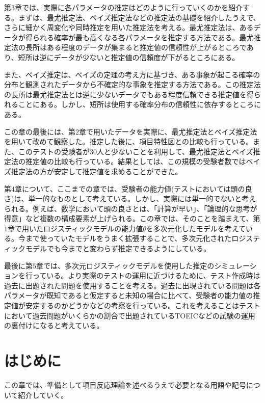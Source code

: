 \documentclass[12pt]{jarticle}
\numberwithin{equation}{subsection}
\begin{document}
第$3$章では、実際に各パラメータの推定はどのように行っていくのかを紹介する。まずは、最尤推定法、ベイズ推定法などの推定法の基礎を紹介したうえで、さらに細かく周変化や同時推定を用いた推定法を考える。最尤推定法は、あるデータが得られる確率が最も高くなる各パラメータを推定する方法である。最尤推定法の長所はある程度のデータが集まると推定値の信頼性が上がるところであり、短所は逆にデータが少ないと推定値の信頼度が下がるところにある。

また、ベイズ推定は、ベイズの定理の考え方に基づき、ある事象が起こる確率の分布と観測されたデータから不確定的な事象を推定する方法である。この推定法の長所は最尤推定法とは逆に少ないデータでもある程度信頼できる推定値を得られることにある。しかし、短所は使用する確率分布の信頼性に依存するところにある。

この章の最後には、第$2$章で用いたデータを実際に、最尤推定法とベイズ推定法を用いて改めて観察した。推定した後に、項目特性図との比較も行っている。また、このテストの受験者が$30$人と少ないことを利用して、最尤推定法とベイズ推定法の推定値の比較も行っている。結果としては、この規模の受験者数ではベイズ推定法の方が安定して推定値を求めることができた。

第$4$章について、ここまでの章では、受験者の能力値(テストにおいては頭の良さ)は、単一的なものとして考えている。しかし、実際には単一的でないと考えられる。例えば、数学において頭の良さとは、「計算が早い」、「論理的な思考が得意」など複数の構成要素が上げられる。この章では、そのことを踏まえて、第$1$章で用いたロジスティックモデルの能力値$\theta$を多次元化したモデルを考えている。今まで使っていたモデルをうまく拡張することで、多次元化されたロジスティックモデルでも今までと変わらず推定できるようにしている。

最後に第$5$章では、多次元ロジスティックモデルを使用した推定のシミュレーションを行っている。より実際のテストの運用に近づけるために、テスト作成時は過去に出題された問題を使用することを考える。過去に出現されている問題は各パラメータが既知であると仮定すると未知の場合に比べて、受験者の能力値の推定値が安定するのかどうかなどの考察を行っている。これを考えることはテストにおいて過去問題がいくらかの割合で出題されているTOEICなどの試験の運用の裏付けになると考えている。
\newpage
\tableofcontents
\newpage
\setcounter{page}{1}
\section{はじめに}
この章では、準備として項目反応理論を述べるうえで必要となる用語や記号について紹介していく。
\end{document}
